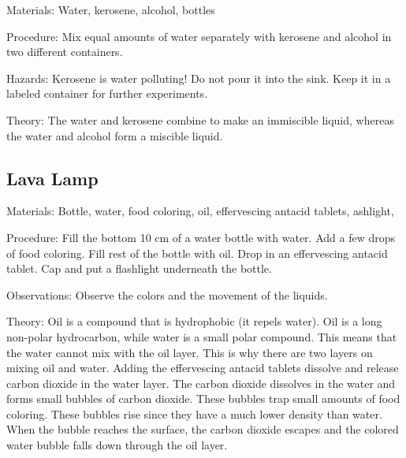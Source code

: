 \begin{multicols}{2}
\begin{description*}
\item[Materials:]{Water, kerosene, alcohol, bottles}
\item[Procedure:]{Mix equal amounts of water separately with
kerosene and alcohol in two different containers.}
\item[Hazards:]{Kerosene is water polluting! Do not pour it
into the sink. Keep it in a labeled container for
further experiments.}
\item[Theory:]{The water and kerosene combine to make an immiscible liquid, whereas the water and alcohol form a miscible liquid.}
\end{description*}

\subsection{Lava Lamp} %


\begin{description*}
\item[Materials:]{Bottle, water, food coloring, oil, effervescing
antacid tablets, 
ashlight,}
\item[Procedure:]{Fill the bottom 10 cm of a water bottle with water. Add
a few drops of food coloring. Fill rest of the bottle with oil. Drop in
an effervescing antacid tablet. Cap and put a 
flashlight underneath the
bottle. }
\item[Observations:]{Observe the colors and the movement of the liquids.}
\item[Theory:]{Oil is a compound that is hydrophobic (it repels
water). Oil is a long non-polar hydrocarbon, while water
is a small polar compound. This means that the water cannot mix with
the oil layer. This is why there are two layers on mixing oil and water.
Adding the effervescing antacid tablets dissolve and release carbon dioxide
in the water layer. The carbon dioxide dissolves in the water and forms
small bubbles of carbon dioxide. These bubbles trap small amounts of
food coloring. These bubbles rise since they have a much lower density
than water. When the bubble reaches the surface, the carbon dioxide
escapes and the colored water bubble falls down through the oil layer.}
\end{description*}


\end{multicols}
